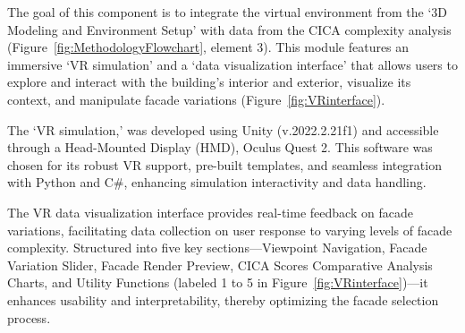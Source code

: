 %


The goal of this component is to integrate the virtual environment from the `3D Modeling and Environment Setup' with data from the CICA complexity analysis (Figure~\ref{fig:MethodologyFlowchart}, element 3).
This module features an immersive `VR simulation' and a `data visualization interface' that allows users to explore and interact with the building's interior and exterior, visualize its context, and manipulate facade variations (Figure~\ref{fig:VRinterface}).

The `VR simulation,' was developed using Unity (v.2022.2.21f1) and accessible through a Head-Mounted Display (HMD), Oculus Quest 2.
This software was chosen for its robust VR support, pre-built templates, and seamless integration with Python and C\#, enhancing simulation interactivity and data handling.

The VR data visualization interface provides real-time feedback on facade variations, facilitating data collection on user response to varying levels of facade complexity.
Structured into five key sections—Viewpoint Navigation, Facade Variation Slider, Facade Render Preview, CICA Scores Comparative Analysis Charts, and Utility Functions (labeled 1 to 5 in Figure~\ref{fig:VRinterface})—it enhances usability and interpretability, thereby optimizing the facade selection process.





